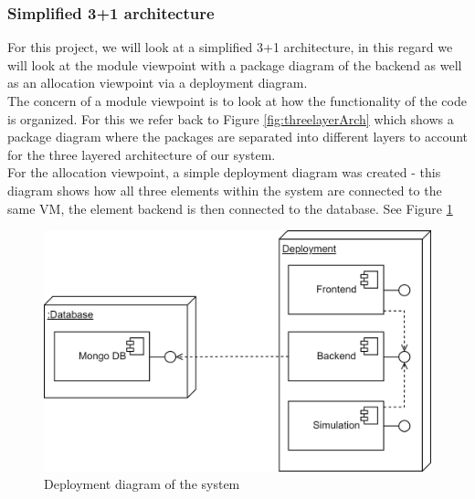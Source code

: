 \subsubsection{Simplified 3+1 architecture}
For this project, we will look at a simplified 3+1 architecture, in this regard we will look at the module viewpoint with a package diagram of the backend as well as an allocation viewpoint via a deployment diagram.\\
The concern of a module viewpoint is to look at how the functionality of the code is organized. For this we refer back to Figure \ref{fig:threelayerArch} which shows a package diagram where the packages are separated into different layers to account for the three layered architecture of our system.\\
For the allocation viewpoint, a simple deployment diagram was created - this diagram shows how all three elements within the system are connected to the same VM, the element backend is then connected to the database. See Figure \ref{fig:deploymentDiagram}
\begin{figure}[h]
    \centering
    \includegraphics[width =.7 \textwidth]{images/DeploymentDiagram.png}
    \caption{Deployment diagram of the system}
    \label{fig:deploymentDiagram}
\end{figure}
